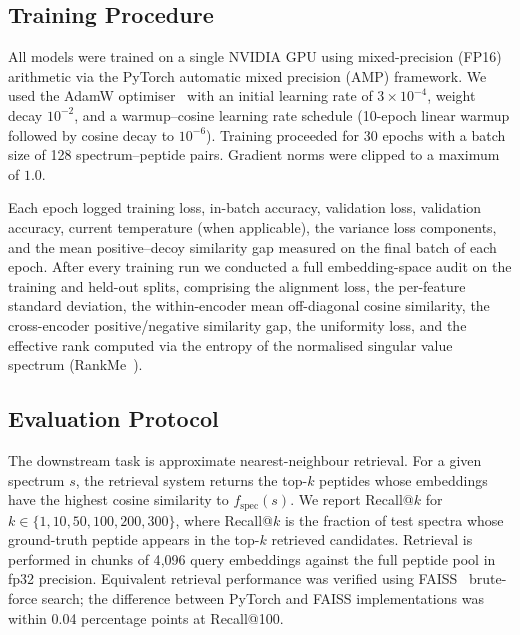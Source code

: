 \documentclass[pdflatex,sn-mathphys-num]{sn-jnl}%
\theoremstyle{thmstyleone}%
\theoremstyle{thmstyletwo}%
\theoremstyle{thmstylethree}%
\begin{document}
\subsection{Training Procedure}
\label{subsec:training}

All models were trained on a single NVIDIA GPU using mixed-precision (FP16) arithmetic via the PyTorch automatic mixed precision (AMP) framework. We used the AdamW optimiser~\cite{loshchilov2019adamw} with an initial learning rate of $3 \times 10^{-4}$, weight decay $10^{-2}$, and a warmup--cosine learning rate schedule (10-epoch linear warmup followed by cosine decay to $10^{-6}$). Training proceeded for 30 epochs with a batch size of 128 spectrum--peptide pairs. Gradient norms were clipped to a maximum of $1.0$.

Each epoch logged training loss, in-batch accuracy, validation loss, validation accuracy, current temperature (when applicable), the variance loss components, and the mean positive--decoy similarity gap measured on the final batch of each epoch. After every training run we conducted a full embedding-space audit on the training and held-out splits, comprising the alignment loss, the per-feature standard deviation, the within-encoder mean off-diagonal cosine similarity, the cross-encoder positive/negative similarity gap, the uniformity loss, and the effective rank computed via the entropy of the normalised singular value spectrum (RankMe~\cite{garrido2023rankme}).

\subsection{Evaluation Protocol}
\label{subsec:evaluation}

The downstream task is approximate nearest-neighbour retrieval. For a given spectrum $s$, the retrieval system returns the top-$k$ peptides whose embeddings have the highest cosine similarity to $f_\text{spec}(s)$. We report Recall@$k$ for $k \in \{1, 10, 50, 100, 200, 300\}$, where Recall@$k$ is the fraction of test spectra whose ground-truth peptide appears in the top-$k$ retrieved candidates. Retrieval is performed in chunks of 4{,}096 query embeddings against the full peptide pool in fp32 precision. Equivalent retrieval performance was verified using FAISS~\cite{johnson2019faiss} brute-force search; the difference between PyTorch and FAISS implementations was within 0.04 percentage points at Recall@100.
\end{document}
